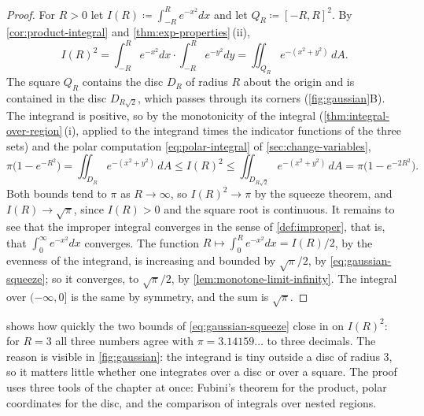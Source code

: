 \begin{proof}
For $R>0$ let $I(R)\coloneqq\int_{-R}^Re^{-x^2}dx$ and let $Q_R\coloneqq[-R,R]^2$. By \cref{cor:product-integral} and \cref{thm:exp-properties}\,(ii),
\[
I(R)^2=\int_{-R}^Re^{-x^2}dx\cdot\int_{-R}^Re^{-y^2}dy=\iint_{Q_R}e^{-(x^2+y^2)}\,dA .
\]
The square $Q_R$ contains the disc $D_R$ of radius $R$ about the origin and is contained in the disc $D_{R\sqrt2}$, which passes through its corners (\cref{fig:gaussian}B). The integrand is positive, so by the monotonicity of the integral (\cref{thm:integral-over-region}\,(i), applied to the integrand times the indicator functions of the three sets) and the polar computation \eqref{eq:polar-integral} of \cref{sec:change-variables},
\begin{equation}
\pi\bigl(1-e^{-R^2}\bigr)=\iint_{D_R}e^{-(x^2+y^2)}\,dA\le I(R)^2\le\iint_{D_{R\sqrt2}}e^{-(x^2+y^2)}\,dA=\pi\bigl(1-e^{-2R^2}\bigr).
\label{eq:gaussian-squeeze}
\end{equation}
Both bounds tend to $\pi$ as $R\to\infty$, so $I(R)^2\to\pi$ by the squeeze theorem, and $I(R)\to\sqrt\pi$, since $I(R)>0$ and the square root is continuous. It remains to see that the improper integral converges in the sense of \cref{def:improper}, that is, that $\int_0^\infty e^{-x^2}dx$ converges. The function $R\mapsto\int_0^Re^{-x^2}dx=I(R)/2$, by the evenness of the integrand, is increasing and bounded by $\sqrt\pi/2$, by \eqref{eq:gaussian-squeeze}; so it converges, to $\sqrt\pi/2$, by \cref{lem:monotone-limit-infinity}. The integral over $(-\infty,0]$ is the same by symmetry, and the sum is $\sqrt\pi$.
\end{proof}

 shows how quickly the two bounds of \eqref{eq:gaussian-squeeze} close in on $I(R)^2$: for $R=3$ all three numbers agree with $\pi=3.14159\ldots$ to three decimals. The reason is visible in \cref{fig:gaussian}: the integrand is tiny outside a disc of radius $3$, so it matters little whether one integrates over a disc or over a square. The proof uses three tools of the chapter at once: Fubini's theorem for the product, polar coordinates for the disc, and the comparison of integrals over nested regions.

